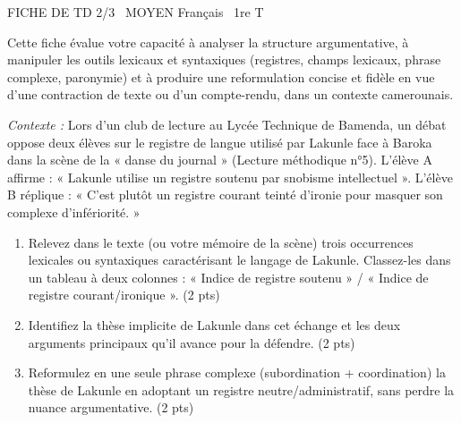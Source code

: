 \documentclass[11pt]{article}
\begin{document}
\begin{tcolorbox}[enhanced,colback=popink,colframe=popink,arc=10pt,boxrule=0pt,left=12pt,right=12pt,top=9pt,bottom=9pt]
{\color{white}\popxbold\small FICHE DE TD 2/3 \textbullet\ MOYEN \hfill Français \textbullet\ 1re T\par}
\end{tcolorbox}
\vspace{4pt}
\noindent Cette fiche évalue votre capacité à analyser la structure argumentative, à manipuler les outils lexicaux et syntaxiques (registres, champs lexicaux, phrase complexe, paronymie) et à produire une reformulation concise et fidèle en vue d'une contraction de texte ou d'un compte-rendu, dans un contexte camerounais.

\begin{exercice}
    \textit{Contexte :} Lors d'un club de lecture au Lycée Technique de Bamenda, un débat oppose deux élèves sur le registre de langue utilisé par Lakunle face à Baroka dans la scène de la « danse du journal » (Lecture méthodique n°5). L'élève A affirme : « Lakunle utilise un registre soutenu par snobisme intellectuel ». L'élève B réplique : « C'est plutôt un registre courant teinté d'ironie pour masquer son complexe d'infériorité. »
    \begin{enumerate}
        \item Relevez dans le texte (ou votre mémoire de la scène) trois occurrences lexicales ou syntaxiques caractérisant le langage de Lakunle. Classez-les dans un tableau à deux colonnes : « Indice de registre soutenu » / « Indice de registre courant/ironique ». (2 pts)
        \item Identifiez la thèse implicite de Lakunle dans cet échange et les deux arguments principaux qu'il avance pour la défendre. (2 pts)
        \item Reformulez en une seule phrase complexe (subordination + coordination) la thèse de Lakunle en adoptant un registre neutre/administratif, sans perdre la nuance argumentative. (2 pts)
    \end{enumerate}
\end{exercice}
\end{document}
